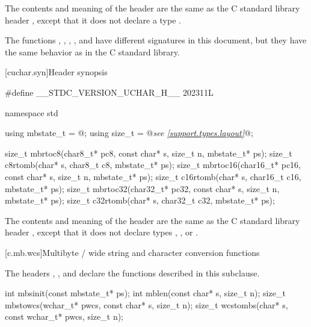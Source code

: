 \pnum
The contents and meaning of the header 
are the same as the C standard library header
, except that it does not declare a type .

\pnum
\begin{note}
The functions
, , , , and 
have different signatures in this document,
but they have the same behavior as in the C standard library.
\end{note}


[cuchar.syn]{Header  synopsis}

%
%
%
%
%
%
%
%
\begin{codeblock}
#define __STDC_VERSION_UCHAR_H__ 202311L

namespace std {
  using mbstate_t = @\seebelow@;
  using size_t = @\textit{see \ref{support.types.layout}}@;

  size_t mbrtoc8(char8_t* pc8, const char* s, size_t n, mbstate_t* ps);
  size_t c8rtomb(char* s, char8_t c8, mbstate_t* ps);
  size_t mbrtoc16(char16_t* pc16, const char* s, size_t n, mbstate_t* ps);
  size_t c16rtomb(char* s, char16_t c16, mbstate_t* ps);
  size_t mbrtoc32(char32_t* pc32, const char* s, size_t n, mbstate_t* ps);
  size_t c32rtomb(char* s, char32_t c32, mbstate_t* ps);
}
\end{codeblock}

\pnum
The contents and meaning of the header 
are the same as the C standard library header ,
except that it does not declare types
, , or .


[c.mb.wcs]{Multibyte / wide string and character conversion functions}

\pnum
\begin{note}
The headers ,
,
and 
declare the functions described in this subclause.
\end{note}

%
%
%
%
\begin{itemdecl}
int mbsinit(const mbstate_t* ps);
int mblen(const char* s, size_t n);
size_t mbstowcs(wchar_t* pwcs, const char* s, size_t n);
size_t wcstombs(char* s, const wchar_t* pwcs, size_t n);
\end{itemdecl}

